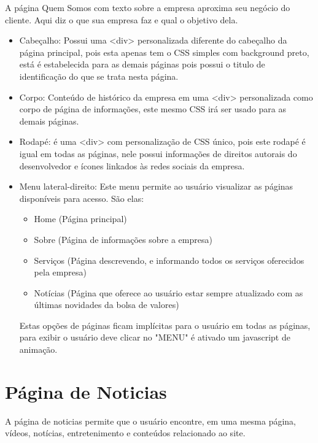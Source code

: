\documentclass[
	12pt,				%
    oneside,			%
	a4paper,			%
	english,			%
	french,				%
	spanish,			%
	brazil,				%
	]{abntex2}
\begin{document}
A página Quem Somos com texto sobre a empresa aproxima seu negócio do cliente. Aqui diz o que sua empresa faz e qual o objetivo dela.

\begin{itemize}
	\item{Cabeçalho: Possui uma <div> personalizada diferente do cabeçalho da página principal, pois esta apenas tem o CSS simples com background preto, está é estabelecida para as demais páginas pois possui o titulo de identificação do que se trata nesta página.}
	\item{Corpo: Conteúdo de histórico da empresa em uma <div> personalizada como corpo de página de informações, este mesmo CSS irá ser usado para as demais páginas.}
	\item{Rodapé: é uma <div> com personalização de CSS único, pois este rodapé é igual em todas as páginas, nele possui informações de direitos autorais do desenvolvedor e ícones linkados às redes sociais da empresa.}
	
	\item{Menu lateral-direito: Este menu permite ao usuário visualizar as páginas disponíveis para acesso. São elas: 
	
	\begin{itemize}
			
	\item{Home (Página principal)}
	\item{Sobre (Página de informações sobre a empresa)}
	\item{Serviços (Página descrevendo, e informando todos os serviços oferecidos pela empresa)} 		    \item{Notícias (Página que oferece ao usuário estar sempre atualizado com as últimas novidades da bolsa de valores)}
	
	\end{itemize}
	
	Estas opções de páginas ficam implícitas para o usuário em todas as páginas, para exibir o usuário deve clicar no "MENU" é ativado um javascript de animação.
}
\end{itemize}

\chapter{Página de Noticias}

A página de noticias permite que o usuário encontre, em uma mesma página, vídeos, notícias, entretenimento e conteúdos relacionado ao site.
\end{document}
